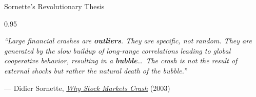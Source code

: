 \documentclass[9pt, aspectratio=169, t]{beamer}
\begin{document}
\begin{frame}{Sornette's Revolutionary Thesis}
    \begin{cminipage}{0.95\textwidth}
    {\footnotesize
    \begin{center}
        \begin{minipage}{0.9\textwidth}
            \begin{exampleblock}{}
                \large\centering
                \textit{``Large financial crashes are \textbf{outliers}. They are specific, not random. They are generated by the slow buildup of long-range correlations leading to global cooperative behavior, resulting in a \textbf{bubble}\ldots\ The crash is not the result of external shocks but rather the natural death of the bubble.''}

                \vspace{2mm}
                \hfill --- Didier Sornette, \href{https://press.princeton.edu/books/paperback/9780691175959/why-stock-markets-crash}{\textit{Why Stock Markets Crash}} (2003)
            \end{exampleblock}
        \end{minipage}
    \end{center}

}
\end{cminipage}
\end{frame}
\end{document}
